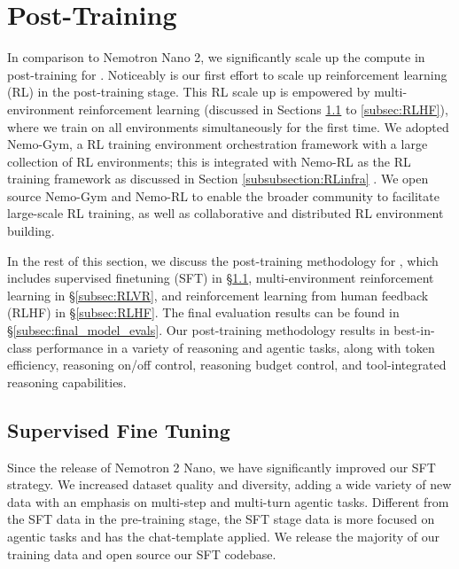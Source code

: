 \section{Post-Training}
\label{sec:alignment}
In comparison to Nemotron Nano 2, we significantly scale up the compute in post-training for \ourmodel. 
Noticeably \ourmodel is our first effort to scale up reinforcement learning (RL) in the post-training stage. 
This RL scale up is empowered by multi-environment reinforcement learning (discussed in Sections \ref{subsec:SFT} to \ref{subsec:RLHF}), where we train on all environments simultaneously for the first time. We adopted Nemo-Gym, a RL training environment orchestration framework with a large collection of RL environments; this is integrated with Nemo-RL as the RL training framework as discussed in Section \ref{subsubsection:RLinfra} \citep{nemo-gym, nemo-rl}. We open source Nemo-Gym and Nemo-RL to enable the broader community to facilitate large-scale RL training, as well as collaborative and distributed RL environment building.

In the rest of this section, we discuss the post-training methodology for \ourmodel, which includes supervised finetuning (SFT) in \S\ref{subsec:SFT}, multi-environment reinforcement learning in \S\ref{subsec:RLVR}, and reinforcement learning from human feedback (RLHF) in \S\ref{subsec:RLHF}. The final evaluation results can be found in \S\ref{subsec:final_model_evals}. Our post-training methodology results in best-in-class performance in a variety of reasoning and agentic tasks, along with token efficiency, reasoning on/off control, reasoning budget control, and tool-integrated reasoning capabilities.  

\subsection{Supervised Fine Tuning}
\label{subsec:SFT}
Since the release of Nemotron 2 Nano, we have significantly improved our SFT strategy. We increased dataset quality and diversity, adding a wide variety of new data with an emphasis on multi-step and multi-turn agentic tasks. Different from the SFT data in the pre-training stage, the SFT stage data is more focused on agentic tasks and has the chat-template applied. We release the majority of our training data and open source our SFT codebase.

